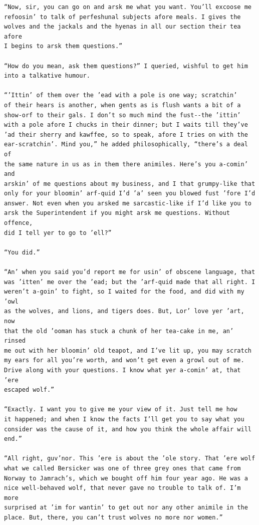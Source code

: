 \documentclass{article}
\begin{document}
\begin{verbatim}
“Now, sir, you can go on and arsk me what you want. You’ll excoose me
refoosin’ to talk of perfeshunal subjects afore meals. I gives the
wolves and the jackals and the hyenas in all our section their tea afore
I begins to arsk them questions.”

“How do you mean, ask them questions?” I queried, wishful to get him
into a talkative humour.

“’Ittin’ of them over the ’ead with a pole is one way; scratchin’
of their hears is another, when gents as is flush wants a bit of a
show-orf to their gals. I don’t so much mind the fust--the ’ittin’
with a pole afore I chucks in their dinner; but I waits till they’ve
’ad their sherry and kawffee, so to speak, afore I tries on with the
ear-scratchin’. Mind you,” he added philosophically, “there’s a deal of
the same nature in us as in them there animiles. Here’s you a-comin’ and
arskin’ of me questions about my business, and I that grumpy-like that
only for your bloomin’ arf-quid I’d ’a’ seen you blowed fust ’fore I’d
answer. Not even when you arsked me sarcastic-like if I’d like you to
arsk the Superintendent if you might arsk me questions. Without offence,
did I tell yer to go to ’ell?”

“You did.”

“An’ when you said you’d report me for usin’ of obscene language, that
was ’itten’ me over the ’ead; but the ’arf-quid made that all right. I
weren’t a-goin’ to fight, so I waited for the food, and did with my ’owl
as the wolves, and lions, and tigers does. But, Lor’ love yer ’art, now
that the old ’ooman has stuck a chunk of her tea-cake in me, an’ rinsed
me out with her bloomin’ old teapot, and I’ve lit up, you may scratch
my ears for all you’re worth, and won’t get even a growl out of me.
Drive along with your questions. I know what yer a-comin’ at, that ’ere
escaped wolf.”

“Exactly. I want you to give me your view of it. Just tell me how
it happened; and when I know the facts I’ll get you to say what you
consider was the cause of it, and how you think the whole affair will
end.”

“All right, guv’nor. This ’ere is about the ’ole story. That ’ere wolf
what we called Bersicker was one of three grey ones that came from
Norway to Jamrach’s, which we bought off him four year ago. He was a
nice well-behaved wolf, that never gave no trouble to talk of. I’m more
surprised at ’im for wantin’ to get out nor any other animile in the
place. But, there, you can’t trust wolves no more nor women.”


\end{verbatim}
\end{document}
